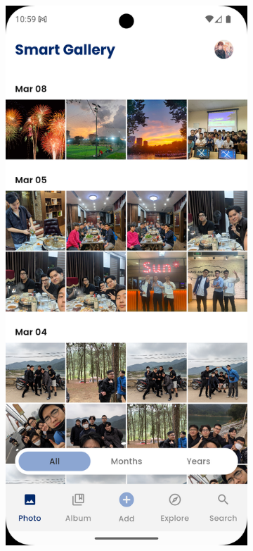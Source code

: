 \begin{figure}[H]
\begin{subfigure}{0.32\textwidth}
        \includegraphics[width=1\linewidth]{figures/c4/4-2/gallery_1.png} 

\end{subfigure}
\end{figure}
